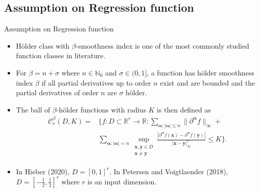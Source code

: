 \documentclass{if-beamer}
\begin{document}
\subsection{Assumption on Regression function}
\begin{frame}{Assumption on Regression function}
\begin{itemize}
    \item H\"older class with $\beta$-smoothness index is one of the most commonly studied function classes in literature.
    \item For $\beta=n+\sigma$ where $n \in \mathbb{N}_{0}$ and $\sigma \in (0,1]$, a function has h\"older smoothness index $\beta$ if all partial derivatives up to order $n$ exist and are bounded and the partial derivatives of order $n$ are $\sigma$ h\"older.
    \item The ball of $\beta$-h\"older functions with radius $K$ is then defined as 
        \begin{eqnarray*}
            \mathcal{C}_{r}^{\beta}(D,K) = &\bigg\{ f : D\subset \mathbb{R}^{r} \rightarrow{\mathbb{R}} : 
            \sum_{\boldsymbol{\alpha}:|\boldsymbol{\alpha}|\leq n} \|\partial^{\boldsymbol{\alpha}}{f}\|_{\infty} + \\ &\sum_{\boldsymbol{\alpha}:|\boldsymbol{\alpha}|=n} \sup_{\substack{\boldsymbol{x}, \boldsymbol{y} \in D \\ \boldsymbol{x} \ne \boldsymbol{y}}} \frac{|\partial^{\boldsymbol{\alpha}}f(\boldsymbol{x}) - \partial^{\boldsymbol{\alpha}}f(\boldsymbol{y})|}{|\boldsymbol{x}-\boldsymbol{y}|_{\infty}^{\sigma}} \leq K \bigg\}. \nonumber
        \end{eqnarray*}
    \item In Hieber (2020), $D=[0,1]^{r}$. In Petersen and Voigtlaender (2018), $D=[-\frac{1}{2},\frac{1}{2}]^{r}$ where $r$ is an input dimension.
\end{itemize}
\end{frame}
\end{document}

